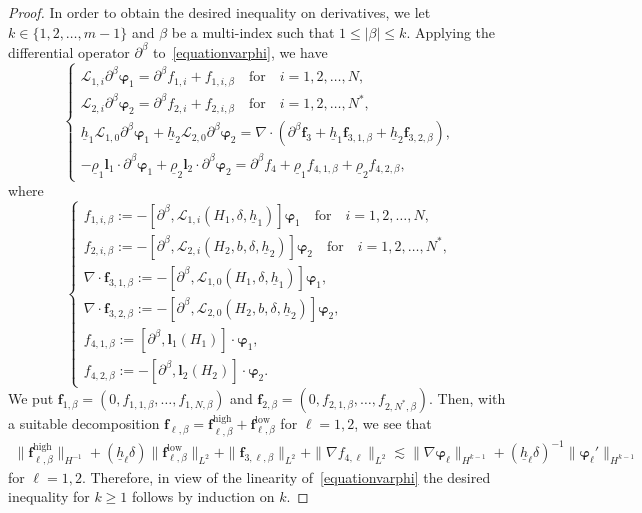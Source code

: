 \documentclass[11pt,leqno]{article}
\numberwithin{equation}{section}
\numberwithin{figure}{section}
\begin{document}
\begin{proof}
In order to obtain the desired inequality on derivatives, we let $k\in\{1,2,\ldots,m-1\}$ and $\beta$ be a 
multi-index such that $1\leq|\beta|\leq k$. 
Applying the differential operator $\partial^\beta$ to~\eqref{equationvarphi}, we have 
%
\[
\begin{cases}
 \mathcal{L}_{1,i} \partial^\beta{\bm \varphi}_{1}
  =  \partial^\beta f_{1,i} + f_{1,i,\beta} \quad\mbox{for}\quad i=1,2,\ldots,N, \\
 \mathcal{L}_{2,i} \partial^\beta{\bm \varphi}_{2}
  = \partial^\beta f_{2,i} + f_{2,i,\beta} \quad\mbox{for}\quad i=1,2,\ldots,N^*, \\
 \underline{h}_1\mathcal{L}_{1,0} \partial^\beta{\bm \varphi}_{1}
   + \underline{h}_2\mathcal{L}_{2,0} \partial^\beta{\bm \varphi}_{2}
  = \nabla\cdot (\partial^\beta \bm{f}_3 + \underline{h}_1\bm{f}_{3,1,\beta} + \underline{h}_2\bm{f}_{3,2,\beta}), \\
 - \underline{\rho}_1{\bm l}_1 \cdot \partial^\beta{\bm \varphi}_1
    + \underline{\rho}_2{\bm l}_2 \cdot \partial^\beta{\bm \varphi}_2
   = \partial^\beta f_4 + \underline{\rho}_1f_{4,1,\beta} + \underline{\rho}_2f_{4,2,\beta},
\end{cases}
\]
%
where 
%
\[
\begin{cases}
 f_{1,i,\beta} := -[\partial^\beta, \mathcal{L}_{1,i}(H_{1},\delta,\underline{h}_1)]{\bm \varphi}_{1}
  \quad\mbox{for}\quad i=1,2,\ldots,N, \\ 
 f_{2,i,\beta} := -[\partial^\beta, \mathcal{L}_{2,i}(H_{2},b,\delta,\underline{h}_2)]{\bm \varphi}_{2}
  \quad\mbox{for}\quad i=1,2,\ldots,N^*, \\ 
 \nabla\cdot \bm{f}_{3,1,\beta} := -[\partial^\beta, \mathcal{L}_{1,0}(H_{1},\delta,\underline{h}_1)]{\bm \varphi}_{1}, \\
 \nabla\cdot \bm{f}_{3,2,\beta} := -[\partial^\beta, \mathcal{L}_{2,0}(H_{2},b,\delta,\underline{h}_2)]{\bm \varphi}_{2} , \\
 f_{4,1,\beta} :=  [\partial^\beta, {\bm l}_1(H_1) ] \cdot {\bm \varphi}_1, \\
 f_{4,2,\beta} := -[\partial^\beta, {\bm l}_2(H_2) ] \cdot {\bm \varphi}_2.
\end{cases}
\]
%
We put $\bm{f}_{1,\beta}=(0,f_{1,1,\beta},\ldots,f_{1,N,\beta})$ and $\bm{f}_{2,\beta}=(0,f_{2,1,\beta},\ldots,f_{2,N^*,\beta})$. 
Then, with a suitable decomposition $\bm{f}_{\ell,\beta} = \bm{f}_{\ell,\beta}^\mathrm{high} + \bm{f}_{\ell,\beta}^\mathrm{low}$ 
for $\ell=1,2$, we see that 
%
\begin{align*}
\|\bm{f}_{\ell,\beta}^\mathrm{high}\|_{H^{-1}} + (\underline{h}_\ell\delta)\|\bm{f}_{\ell,\beta}^\mathrm{low}\|_{L^2}
 + \|\bm{f}_{3,\ell,\beta}\|_{L^2} + \|\nabla f_{4,\ell}\|_{L^2}
\lesssim \|\nabla\bm{\varphi}_\ell\|_{H^{k-1}} + (\underline{h}_\ell\delta)^{-1}\|\bm{\varphi}_\ell'\|_{H^{k-1}}
\end{align*}
%
for $\ell=1,2$. 
Therefore, in view of the linearity of~\eqref{equationvarphi} the desired inequality for $k\geq1$ follows by induction on $k$. 
\end{proof}
\end{document}
